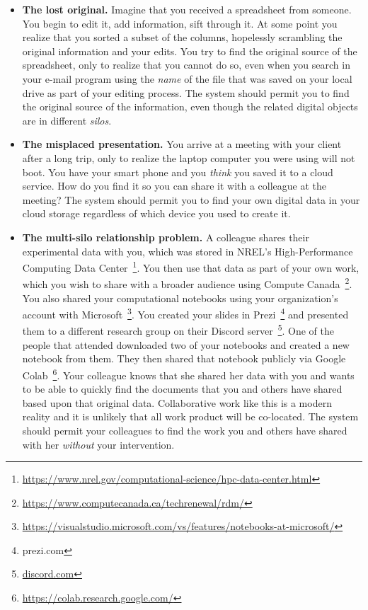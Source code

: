 \begin{itemize}
    \item \label{use-case:e-mail}\textbf{The lost original.} Imagine that you received a spreadsheet
          from someone.  You begin to edit it, add information, sift through it.  At
          some point you realize that you sorted a subset of the columns, hopelessly
          scrambling the original information and your edits. You try to find the
          original source of the spreadsheet, only to realize that you cannot do so,
          even when you search in your e-mail program using the \emph{name} of the
          file that was saved on your local drive as part of your editing process. The
          system should permit you to find the original source of the information,
          even though the related digital objects are in different \emph{silos}.

    \item \label{use-case:misplaced-presentation}\textbf{The misplaced presentation.} You arrive at a meeting with your
          client after a long trip, only to realize the laptop computer you were
          using will not boot.  You have your smart phone and you \emph{think}
          you saved it to a cloud service.  How do you find it so you can share
          it with a colleague at the meeting? The system should permit you to
          find your own digital data in your cloud storage regardless of which
          device you used to create it.

    \item \label{use-case:multi-silo-problem}\textbf{The multi-silo relationship problem.} A colleague shares their
          experimental data with you, which was stored in NREL's
          High-Performance Computing Data
          Center~\footnote{\url{https://www.nrel.gov/computational-science/hpc-data-center.html}}.
          You then use that data as part of your own work, which you wish to
          share with a broader audience using Compute
          Canada~\footnote{\url{https://www.computecanada.ca/techrenewal/rdm/}}.
          You also shared your computational notebooks using your organization's
          account with Microsoft~\footnote{\url{https://visualstudio.microsoft.com/vs/features/notebooks-at-microsoft/}}.
          You created your slides in
          Prezi~\footnote{prezi.com} and presented them to a different research
          group on their Discord server~\footnote{\url{discord.com}}. One of the
          people that attended downloaded two of your notebooks and created a
          new notebook from them.  They then shared that notebook publicly via
          Google Colab~\footnote{\url{https://colab.research.google.com/}}.
          Your colleague knows that she shared her data with you and wants to be
          able to quickly find the documents that you and others have shared
          based upon that original data. Collaborative work like this is a
          modern reality and it is unlikely that all work product will be co-located.
          The system should permit your colleagues to find the work you and
          others have shared with her \emph{without} your intervention.


\end{itemize}
